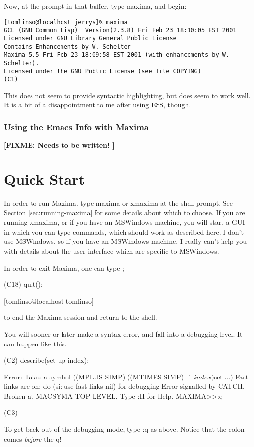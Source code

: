 \documentclass[titlepage]{article}
\newcommand{\noun}[1]{\index{#1}{\large \bf #1 }}%
\newcommand{\fixme}[1]{{\bf[FIXME: #1 ]}}%
\begin{document}
Now, at the prompt in that buffer, type maxima, and begin:

\begin{verbatim}
[tomlinso@localhost jerrys]% maxima
GCL (GNU Common Lisp)  Version(2.3.8) Fri Feb 23 18:10:05 EST 2001
Licensed under GNU Library General Public License
Contains Enhancements by W. Schelter
Maxima 5.5 Fri Feb 23 18:09:58 EST 2001 (with enhancements by W.
Schelter).
Licensed under the GNU Public License (see file COPYING)
(C1)
\end{verbatim}
This does not seem to provide syntactic highlighting, but does seem to
work well.  It is a bit of a disappointment to me after using ESS,
though.


\subsubsection{Using the Emacs Info with
Maxima}\label{sec:using-emacs-info}

\fixme{Needs to be written!}




\section{Quick Start}

In order to run Maxima, type maxima or xmaxima at the shell prompt.  See
Section \vref{sec:running-maxima} for some details about which to
choose.  If you are running xmaxima, or if you  have an MSWindows
machine, you  will start a GUI in which you can type commands, which
should work  as described here.  I don't use MSWindows, so if you have
an MSWindows machine, I really can't help you with details about the
user interface which are specific to MSWindows.

In order to exit Maxima, one can type \noun{quit()};

\begin{verbatimtab}
(C18) quit();

[tomlinso@localhost tomlinso]%
\end{verbatimtab}
 to end the Maxima session and return to the shell.

You will sooner or later make a syntax error, and fall into a debugging
level.  It can happen like this:
\begin{verbatimtab}
(C2) describe(set-up-index);

Error: Takes a symbol ((MPLUS SIMP) ((MTIMES SIMP) -1 $index) $set ...)
Fast links are on: do (si::use-fast-links nil) for debugging
Error signalled by CATCH.
Broken at MACSYMA-TOP-LEVEL.  Type :H for Help.
MAXIMA>>:q

(C3)
\end{verbatimtab}
 To get back out of the debugging mode, type :q as above.  Notice that
the colon comes \emph{before} the q!
\end{document}
